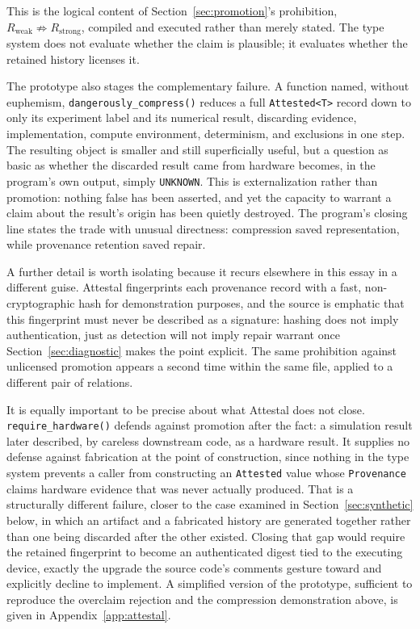 \documentclass[11pt]{article}
\begin{document}
This is the logical content of Section~\ref{sec:promotion}'s prohibition, $R_{\mathrm{weak}} \not\Rightarrow R_{\mathrm{strong}}$, compiled and executed rather than merely stated. The type system does not evaluate whether the claim is plausible; it evaluates whether the retained history licenses it.

The prototype also stages the complementary failure. A function named, without euphemism, \texttt{dangerously\_compress()} reduces a full \texttt{Attested<T>} record down to only its experiment label and its numerical result, discarding evidence, implementation, compute environment, determinism, and exclusions in one step. The resulting object is smaller and still superficially useful, but a question as basic as whether the discarded result came from hardware becomes, in the program's own output, simply \texttt{UNKNOWN}. This is externalization rather than promotion: nothing false has been asserted, and yet the capacity to warrant a claim about the result's origin has been quietly destroyed. The program's closing line states the trade with unusual directness: compression saved representation, while provenance retention saved repair.

A further detail is worth isolating because it recurs elsewhere in this essay in a different guise. Attestal fingerprints each provenance record with a fast, non-cryptographic hash for demonstration purposes, and the source is emphatic that this fingerprint must never be described as a signature: hashing does not imply authentication, just as detection will not imply repair warrant once Section~\ref{sec:diagnostic} makes the point explicit. The same prohibition against unlicensed promotion appears a second time within the same file, applied to a different pair of relations.

It is equally important to be precise about what Attestal does not close. \texttt{require\_hardware()} defends against promotion after the fact: a simulation result later described, by careless downstream code, as a hardware result. It supplies no defense against fabrication at the point of construction, since nothing in the type system prevents a caller from constructing an \texttt{Attested} value whose \texttt{Provenance} claims hardware evidence that was never actually produced. That is a structurally different failure, closer to the case examined in Section~\ref{sec:synthetic} below, in which an artifact and a fabricated history are generated together rather than one being discarded after the other existed. Closing that gap would require the retained fingerprint to become an authenticated digest tied to the executing device, exactly the upgrade the source code's comments gesture toward and explicitly decline to implement. A simplified version of the prototype, sufficient to reproduce the overclaim rejection and the compression demonstration above, is given in Appendix~\ref{app:attestal}.
\end{document}
